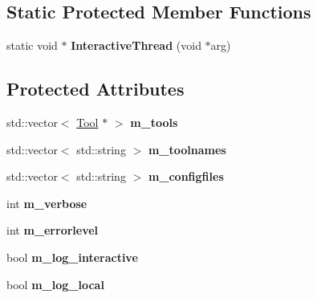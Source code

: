\subsection*{Static Protected Member Functions}
\begin{DoxyCompactItemize}
\item 
\hypertarget{classToolChain_a7f6fcdce202336463b71aa5167758bd2}{static void $\ast$ {\bfseries Interactive\-Thread} (void $\ast$arg)}\label{classToolChain_a7f6fcdce202336463b71aa5167758bd2}

\end{DoxyCompactItemize}
\subsection*{Protected Attributes}
\begin{DoxyCompactItemize}
\item 
\hypertarget{classToolChain_a5327190043dfcdc67affc35ddb836c68}{std\-::vector$<$ \hyperlink{classTool}{Tool} $\ast$ $>$ {\bfseries m\-\_\-tools}}\label{classToolChain_a5327190043dfcdc67affc35ddb836c68}

\item 
\hypertarget{classToolChain_ab88ccb68da6feb135c032f1356a4889f}{std\-::vector$<$ std\-::string $>$ {\bfseries m\-\_\-toolnames}}\label{classToolChain_ab88ccb68da6feb135c032f1356a4889f}

\item 
\hypertarget{classToolChain_a74cb5832ff5a41714a4da2448b87cee6}{std\-::vector$<$ std\-::string $>$ {\bfseries m\-\_\-configfiles}}\label{classToolChain_a74cb5832ff5a41714a4da2448b87cee6}

\item 
\hypertarget{classToolChain_a3e157c7148cbdb9eccd43fce185297f5}{int {\bfseries m\-\_\-verbose}}\label{classToolChain_a3e157c7148cbdb9eccd43fce185297f5}

\item 
\hypertarget{classToolChain_a26843fabb52f0fba5f91be3da7564e4e}{int {\bfseries m\-\_\-errorlevel}}\label{classToolChain_a26843fabb52f0fba5f91be3da7564e4e}

\item 
\hypertarget{classToolChain_a0c1470a33c6f3f2749230ed4b2165c5b}{bool {\bfseries m\-\_\-log\-\_\-interactive}}\label{classToolChain_a0c1470a33c6f3f2749230ed4b2165c5b}

\item 
\hypertarget{classToolChain_a2076a51d02b80034f523b332ddd452c3}{bool {\bfseries m\-\_\-log\-\_\-local}}\label{classToolChain_a2076a51d02b80034f523b332ddd452c3}


\end{DoxyCompactItemize}
